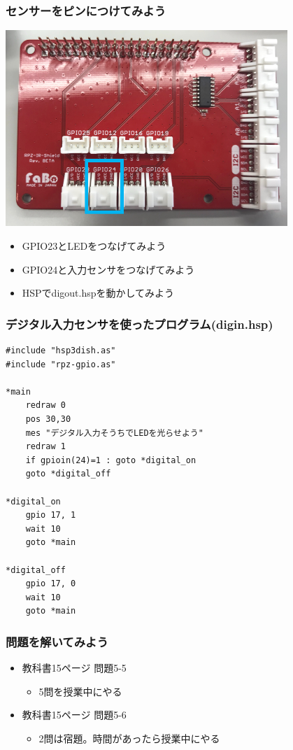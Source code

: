 \begin{frame}
    \frametitle{センサーをピンにつけてみよう}
    \begin{center}
        \includegraphics[width=0.8\textwidth]{images/chap05/text05-img029.png}
        \begin{itemize}
            \item GPIO23とLEDをつなげてみよう
            \item GPIO24と入力センサをつなげてみよう
            \item HSPでdigout.hspを動かしてみよう
        \end{itemize}
    \end{center}
\end{frame}

\begin{frame}[fragile]
    \frametitle{デジタル入力センサを使ったプログラム(digin.hsp)}
\begin{lstlisting}
#include "hsp3dish.as"
#include "rpz-gpio.as"

*main
	redraw 0
	pos 30,30
	mes "デジタル入力そうちでLEDを光らせよう"
	redraw 1
	if gpioin(24)=1 : goto *digital_on
	goto *digital_off
        
*digital_on
	gpio 17, 1
	wait 10
	goto *main

*digital_off
	gpio 17, 0
	wait 10
	goto *main 
\end{lstlisting}
\end{frame}

\begin{frame}[fragile]
    \frametitle{問題を解いてみよう}
    \begin{itemize}
        \item 教科書15ページ 問題5-5
        \begin{itemize}
            \item 5問を授業中にやる
        \end{itemize}
        \item 教科書15ページ 問題5-6
        \begin{itemize}
            \item 2問は宿題。時間があったら授業中にやる
        \end{itemize}

    \end{itemize}
\end{frame}